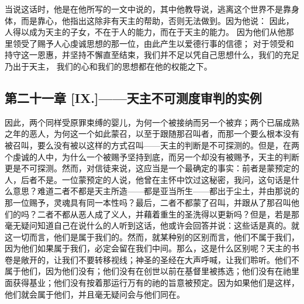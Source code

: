 当说这话时，他是在他所写的一文中说的，其中他教导说，逃离这个世界不是靠身体，而是靠心，他指出这除非有天主的帮助，否则无法做到。因为他说： 因此，人得以成为天主的子女，不在于人的能力，而在于天主的能力。 因为他们从他那里领受了赐予人心虔诚思想的那一位，由此产生以爱德行事的信德； 对于领受和持守这一恩惠，并坚持不懈直至结束，我们并不足以凭自己思想什么，我们的充足乃出于天主， 我们的心和我们的思想都在他的权能之下。\par


\subsection{第二十一章 [IX.]——天主不可测度审判的实例}

因此，两个同样受原罪束缚的婴儿，为何一个被接纳而另一个被弃；两个已届成熟之年的恶人，为何这一个如此蒙召，以至于跟随那召叫者，而那一个要么根本没有被召叫，要么没有被以这样的方式召叫——天主的判断是不可探测的。但是，在两个虔诚的人中，为什么一个被赐予坚持到底，而另一个却没有被赐予，天主的判断更是不可探测。然而，对信徒来说，这应当是一个最确定的事实：前者是蒙预定的人，后者不是。一位蒙预定的人说，他曾在主怀中饮过这秘密，我问，这句话是什么意思？难道二者不都是天主所造——都是亚当所生——都出于尘土，并由那说的那一位赐予，灵魂具有同一本性吗？最后，二者不都蒙了召叫，并跟从了那召叫他们的吗？二者不都从恶人成了义人，并藉着重生的圣洗得以更新吗？但是，若是那毫无疑问知道自己在说什么的人听到这话，他或许会回答并说：这些话是真的。就这一切而言，他们是属于我们的。然而，就某种别的区别而言，他们不属于我们，因为他们如果属于我们，必定会留在我们中间。那么，这是什么区别呢？天主的书卷是敞开的，让我们不要转移视线；神圣的圣经在大声呼喊，让我们聆听。他们不属于他们，因为他们没有；他们没有在创世以前在基督里被拣选；他们没有在祂里面获得基业；他们没有按着那运行万有的祂的旨意被预定。因为如果他们是这样，他们就会属于他们，并且毫无疑问会与他们同在。\par

